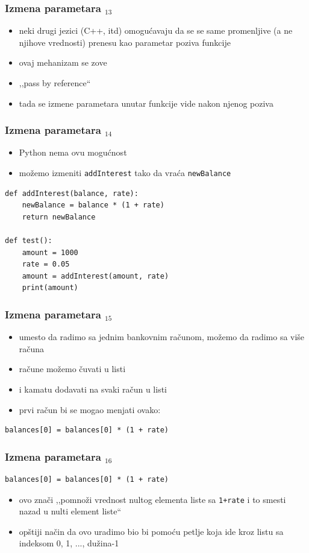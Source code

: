 \documentclass[compress]{beamer}
\begin{document}
\begin{frame}[fragile]
  \frametitle{Izmena parametara $_{13}$}
  \begin{itemize}
    \item neki drugi jezici (C++, itd) omogućavaju da se se same promenljive (a ne njihove vrednosti) prenesu kao parametar poziva funkcije
    \item ovaj mehanizam se zove 
    \item ,,pass by reference``
    \item tada se izmene parametara unutar funkcije vide nakon njenog poziva
  \end{itemize}
\end{frame}

\begin{frame}[fragile]
  \frametitle{Izmena parametara $_{14}$}
  \begin{itemize}
    \item Python nema ovu mogućnost
    \item možemo izmeniti \texttt{addInterest} tako da vraća \texttt{newBalance}
  \end{itemize}
\begin{verbatim}
def addInterest(balance, rate):
    newBalance = balance * (1 + rate)
    return newBalance

def test():
    amount = 1000
    rate = 0.05
    amount = addInterest(amount, rate)
    print(amount)
\end{verbatim}
\end{frame}

\begin{frame}[fragile]
  \frametitle{Izmena parametara $_{15}$}
  \begin{itemize}
    \item umesto da radimo sa jednim bankovnim računom, možemo da radimo sa više računa
    \item račune možemo čuvati u listi
    \item i kamatu dodavati na svaki račun u listi
    \item prvi račun bi se mogao menjati ovako:
  \end{itemize}
\begin{verbatim}
balances[0] = balances[0] * (1 + rate)
\end{verbatim}
\end{frame}

\begin{frame}[fragile]
  \frametitle{Izmena parametara $_{16}$}
\begin{verbatim}
balances[0] = balances[0] * (1 + rate)
\end{verbatim}
  \begin{itemize}
    \item ovo znači ,,pomnoži vrednost nultog elementa liste sa \texttt{1+rate} i to smesti nazad u nulti element liste``
    \item opštiji način da ovo uradimo bio bi pomoću petlje koja ide kroz listu sa indeksom 0, 1, ..., dužina-1
  \end{itemize}
\end{frame}
\end{document}
